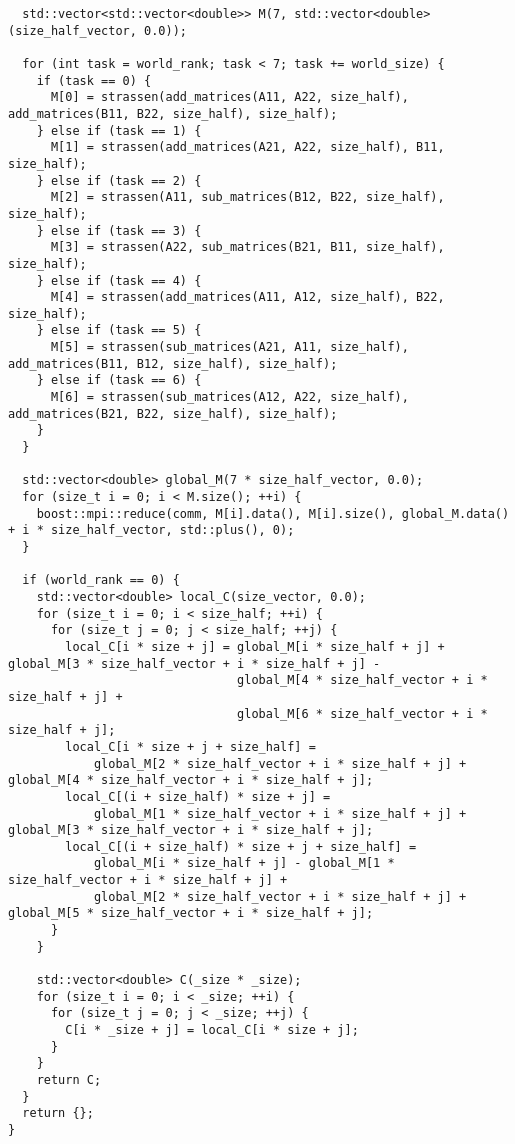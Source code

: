 \documentclass[a4paper, 14pt]{extarticle}
\begin{document}
\begin{lstlisting}
  std::vector<std::vector<double>> M(7, std::vector<double>(size_half_vector, 0.0));

  for (int task = world_rank; task < 7; task += world_size) {
    if (task == 0) {
      M[0] = strassen(add_matrices(A11, A22, size_half), add_matrices(B11, B22, size_half), size_half);
    } else if (task == 1) {
      M[1] = strassen(add_matrices(A21, A22, size_half), B11, size_half);
    } else if (task == 2) {
      M[2] = strassen(A11, sub_matrices(B12, B22, size_half), size_half);
    } else if (task == 3) {
      M[3] = strassen(A22, sub_matrices(B21, B11, size_half), size_half);
    } else if (task == 4) {
      M[4] = strassen(add_matrices(A11, A12, size_half), B22, size_half);
    } else if (task == 5) {
      M[5] = strassen(sub_matrices(A21, A11, size_half), add_matrices(B11, B12, size_half), size_half);
    } else if (task == 6) {
      M[6] = strassen(sub_matrices(A12, A22, size_half), add_matrices(B21, B22, size_half), size_half);
    }
  }

  std::vector<double> global_M(7 * size_half_vector, 0.0);
  for (size_t i = 0; i < M.size(); ++i) {
    boost::mpi::reduce(comm, M[i].data(), M[i].size(), global_M.data() + i * size_half_vector, std::plus(), 0);
  }

  if (world_rank == 0) {
    std::vector<double> local_C(size_vector, 0.0);
    for (size_t i = 0; i < size_half; ++i) {
      for (size_t j = 0; j < size_half; ++j) {
        local_C[i * size + j] = global_M[i * size_half + j] + global_M[3 * size_half_vector + i * size_half + j] -
                                global_M[4 * size_half_vector + i * size_half + j] +
                                global_M[6 * size_half_vector + i * size_half + j];
        local_C[i * size + j + size_half] =
            global_M[2 * size_half_vector + i * size_half + j] + global_M[4 * size_half_vector + i * size_half + j];
        local_C[(i + size_half) * size + j] =
            global_M[1 * size_half_vector + i * size_half + j] + global_M[3 * size_half_vector + i * size_half + j];
        local_C[(i + size_half) * size + j + size_half] =
            global_M[i * size_half + j] - global_M[1 * size_half_vector + i * size_half + j] +
            global_M[2 * size_half_vector + i * size_half + j] + global_M[5 * size_half_vector + i * size_half + j];
      }
    }

    std::vector<double> C(_size * _size);
    for (size_t i = 0; i < _size; ++i) {
      for (size_t j = 0; j < _size; ++j) {
        C[i * _size + j] = local_C[i * size + j];
      }
    }
    return C;
  }
  return {};
}

\end{lstlisting}
	
\end{document}
